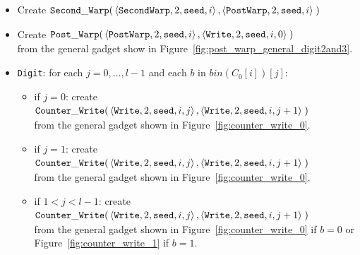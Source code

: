 \begin{itemize}
    \item Create
    $\begin{aligned}[t]
        {\tt Second\_Warp}(&\left\langle {\tt SecondWarp}, 2, {\tt seed}, i \right\rangle,
                     \left\langle {\tt PostWarp},   2, {\tt seed}, i \right\rangle \;)
    \end{aligned}$

    \item Create
    $\begin{aligned}[t]
        {\tt Post\_Warp}(&\left\langle {\tt PostWarp}, 2, {\tt seed}, i    \right\rangle,
                   \left\langle {\tt Write},    2, {\tt seed}, i, 0 \right\rangle \;)
    \end{aligned}$\\ from the general gadget show in Figure~\ref{fig:post_warp_general_digit2and3}.

    \item {\tt Digit}: for each $j=0,\ldots,l-1$ and each $b$ in $bin(C_0[i])[j]$:
    \begin{itemize}
        \item if $j = 0$: create
        $\begin{aligned}[t]
            {\tt Counter\_Write}(&\left\langle {\tt Write}, 2, {\tt seed}, i, j \right\rangle, \left\langle {\tt Write}, 2, {\tt seed}, i, j + 1 \right\rangle \;)
        \end{aligned}$\\from the general gadget shown in Figure~\ref{fig:counter_write_0}.

        \item if $j = 1$: create
        $\begin{aligned}[t]
            {\tt Counter\_Write}(&\left\langle {\tt Write}, 2, {\tt seed}, i, j \right\rangle, \left\langle {\tt Write}, 2, {\tt seed}, i, j + 1 \right\rangle \;)
        \end{aligned}$\\from the general gadget shown in Figure~\ref{fig:counter_write_0}.

        \item if $1 < j < l-1$: create
        $\begin{aligned}[t]
            {\tt Counter\_Write}(&\left\langle {\tt Write}, 2, {\tt seed}, i, j \right\rangle, \left\langle {\tt Write}, 2, {\tt seed}, i, j + 1 \right\rangle \;)
        \end{aligned}$\\from the general gadget shown in Figure~\ref{fig:counter_write_0} if $b = 0$ or Figure~\ref{fig:counter_write_1} if $b = 1$.


\end{itemize}
\end{itemize}
